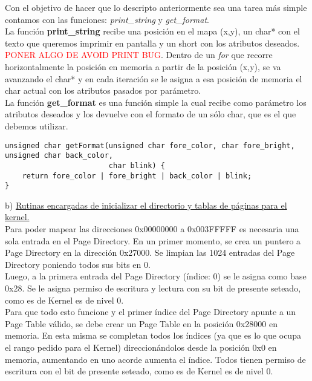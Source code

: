 \documentclass[a4paper]{article}
\begin{document}
Con el objetivo de hacer que lo descripto anteriormente sea una tarea m\'as simple contamos con las funciones: \emph{print_string} y \emph{get_format}.\\

La funci\'on \textbf{print_string} recibe una posici\'on en el mapa (x,y), un char* con el texto que queremos imprimir en pantalla y un short con los atributos deseados. \textcolor{red}{PONER ALGO DE AVOID PRINT BUG}. Dentro de un \textit{for} que recorre horizontalmente la posici\'on en memoria a partir de la posici\'on (x,y), se va avanzando el char* y en cada iteraci\'on se le asigna a esa posici\'on de memoria el char actual con los atributos pasados por par\'ametro.\\

La funci\'on \textbf{get_format} es una funci\'on simple la cual recibe como par\'ametro los atributos deseados y los devuelve con el formato de un s\'olo char, que es el que debemos utilizar.
\begin{codesnippet}
\begin{verbatim}
unsigned char getFormat(unsigned char fore_color, char fore_bright, unsigned char back_color, 
                        char blink) {
    return fore_color | fore_bright | back_color | blink; 
}
\end{verbatim}
\end{codesnippet}


{\large b)} \underline{Rutinas encargadas de inicializar el directorio y tablas de p\'aginas para el kernel.}\\

Para poder mapear las direcciones 0x00000000 a 0x003FFFFF es necesaria una sola entrada en el Page Directory. En un primer momento, se crea un puntero a Page Directory en la direcci\'on 0x27000. Se limpian las 1024 entradas del Page Directory poniendo todos sus bits en 0.\\

Luego, a la primera entrada del Page Directory (\'indice: 0) se le asigna como base 0x28. Se le asigna permiso de escritura y lectura con su bit de presente seteado, como es de Kernel es de nivel 0.\\

Para que todo esto funcione y el primer \'indice del Page Directory apunte a un Page Table v\'alido, se debe crear un Page Table en la posici\'on 0x28000 en memoria. En esta misma se completan todos los \'indices (ya que es lo que ocupa el rango pedido para el Kernel) direccion\'andolos desde la posici\'on 0x0 en memoria, aumentando en uno acorde aumenta el \'indice. Todos tienen permiso de escritura con el bit de presente seteado, como es de Kernel es de nivel 0.\\
\end{document}
